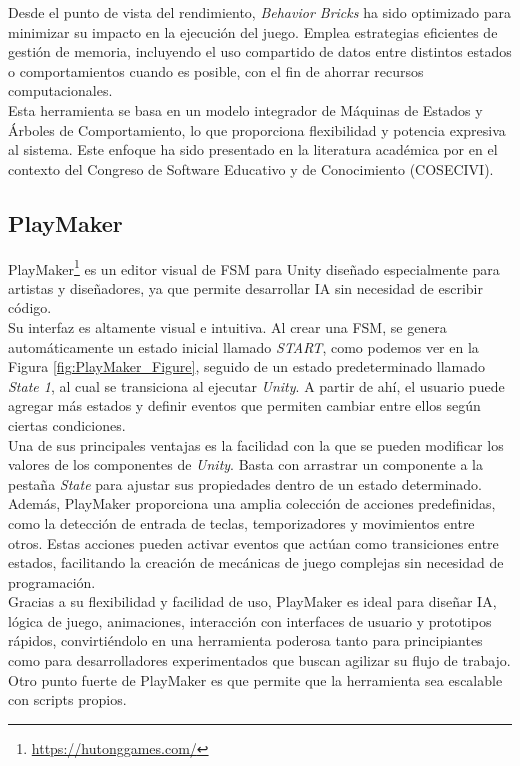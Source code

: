 Desde el punto de vista del rendimiento, \textit{Behavior Bricks} ha sido optimizado para minimizar su impacto en la ejecución del juego. Emplea estrategias eficientes de gestión de memoria, incluyendo el uso compartido de datos entre distintos estados o comportamientos cuando es posible, con el fin de ahorrar recursos computacionales.\\

Esta herramienta se basa en un modelo integrador de Máquinas de Estados y Árboles de Comportamiento, lo que proporciona flexibilidad y potencia expresiva al sistema. Este enfoque ha sido presentado en la literatura académica por \cite{BB} en el contexto del Congreso de Software Educativo y de Conocimiento (COSECIVI).
\subsection{PlayMaker}
PlayMaker\footnote{\url{https://hutonggames.com/}} es un editor visual de FSM para Unity diseñado especialmente para artistas y diseñadores, ya que permite desarrollar IA sin necesidad de escribir código.\\

Su interfaz es altamente visual e intuitiva. Al crear una FSM, se genera automáticamente un estado inicial llamado \textit{START}, como podemos ver en la Figura \ref{fig:PlayMaker_Figure}, seguido de un estado predeterminado llamado \textit{State 1}, al cual se transiciona al ejecutar \textit{Unity}. A partir de ahí, el usuario puede agregar más estados y definir eventos que permiten cambiar entre ellos según ciertas condiciones.\\

Una de sus principales ventajas es la facilidad con la que se pueden modificar los valores de los componentes de \textit{Unity}. Basta con arrastrar un componente a la pestaña \textit{State} para ajustar sus propiedades dentro de un estado determinado. Además, PlayMaker proporciona una amplia colección de acciones predefinidas, como la detección de entrada de teclas, temporizadores y movimientos entre otros. Estas acciones pueden activar eventos que actúan como transiciones entre estados, facilitando la creación de mecánicas de juego complejas sin necesidad de programación.\\

Gracias a su flexibilidad y facilidad de uso, PlayMaker es ideal para diseñar IA, lógica de juego, animaciones, interacción con interfaces de usuario y prototipos rápidos, convirtiéndolo en una herramienta poderosa tanto para principiantes como para desarrolladores experimentados que buscan agilizar su flujo de trabajo. Otro punto fuerte de PlayMaker es que permite que la herramienta sea escalable con scripts propios.\\

